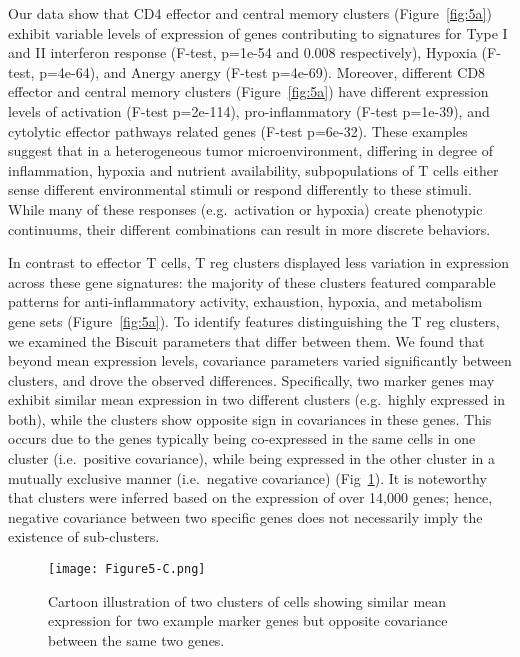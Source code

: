 Our data show that CD4 effector and central memory clusters (Figure~\ref{fig:5a}) exhibit variable levels of expression of genes contributing to signatures for Type I and II interferon response (F-test, p=1e-54 and 0.008 respectively), Hypoxia (F-test, p=4e-64), and Anergy anergy (F-test p=4e-69).
Moreover, different CD8 effector and central memory clusters (Figure~\ref{fig:5a}) have different expression levels of activation (F-test p=2e-114), pro-inflammatory (F-test p=1e-39), and cytolytic effector pathways related genes (F-test p=6e-32).
These examples suggest that in a heterogeneous tumor microenvironment, differing in degree of inflammation, hypoxia and nutrient availability, subpopulations of T cells either sense different environmental stimuli or respond differently to these stimuli.
While many of these responses (e.g.\ activation or hypoxia) create phenotypic continuums, their different combinations can result in more discrete behaviors.

In contrast to effector T cells, T reg clusters displayed less variation in expression across these gene signatures: the majority of these clusters featured comparable patterns for anti-inflammatory activity, exhaustion, hypoxia, and metabolism gene sets (Figure~\ref{fig:5a}).
To identify features distinguishing the T reg clusters, we examined the Biscuit parameters that differ between them.
We found that beyond mean expression levels, covariance parameters varied significantly between clusters, and drove the observed differences.
Specifically, two marker genes may exhibit similar mean expression in two different clusters (e.g.\ highly expressed in both), while the clusters show opposite sign in covariances in these genes.
This occurs due to the genes typically being co-expressed in the same cells in one cluster (i.e.\ positive covariance), while being expressed in the other cluster in a mutually exclusive manner (i.e.\ negative covariance) (Fig~\ref{fig:5c}).
It is noteworthy that clusters were inferred based on the expression of over 14,000 genes; hence, negative covariance between two specific genes does not necessarily imply the existence of sub-clusters.

\begin{figure}
\centering
\texttt{[image: Figure5-C.png]}
\caption{Cartoon illustration of two clusters of cells showing similar mean expression for two example marker genes but opposite covariance between the same two genes.
}
\label{fig:5c}
\end{figure}

